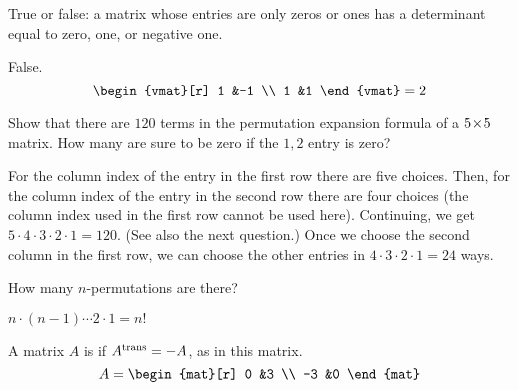 \begin{exercises}
\begin{answer}
    \end{answer}
  \item 
    \cite{Strang}
    True or false: a matrix whose entries are only zeros
    or ones has a determinant equal to zero, one, or negative one.
    \begin{answer}
      False.
      \begin{equation*}
        \begin{vmat}[r]
          1  &-1  \\
          1  &1
        \end{vmat}
        =2
      \end{equation*} 
     \end{answer}
  \item 
    \begin{exparts}
      \partsitem Show that there are $120$ terms in the permutation
         expansion formula of a \( 5 \! \times \! 5 \) matrix.
      \partsitem 
         How many are sure to be zero if the \( 1,2 \) entry is zero?
    \end{exparts}
    \begin{answer}
      \begin{exparts}
        \partsitem For the column index of the entry in the first row there are
          five choices.
          Then, for the column index of the entry in the second row there
          are four choices (the column index used in the first row cannot 
          be used here).
          Continuing, we get $5\cdot 4\cdot 3\cdot 2\cdot 1=120$.
          (See also the next question.)
        \partsitem Once we choose the second column in the first row, 
          we can choose the other entries in \( 4\cdot 3\cdot 2\cdot 1=24 \) 
          ways.
      \end{exparts}  
    \end{answer}
  \item 
    How many \( n \)-permutations are there?
    \begin{answer}
       \( n\cdot(n-1)\cdots 2\cdot 1=n! \) 
    \end{answer}
  \item 
    A matrix \( A \) is 
     if \( {{A}^{\rm trans}}=-A \),
    as in this matrix.
    \begin{equation*}
      A=\begin{mat}[r]
          0  &3  \\
         -3  &0
        \end{mat}

\end{equation*}
\end{exercises}
